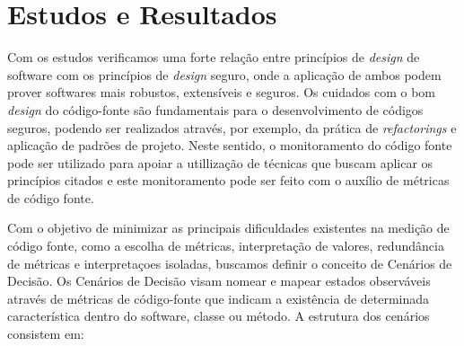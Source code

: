 \section{Estudos e Resultados}
\label{sec:studies}


Com os estudos verificamos uma forte relação entre princípios de \emph{design} de software com os princípios de \emph{design} seguro, onde a aplicação de ambos podem prover softwares mais robustos, extensíveis e seguros. Os cuidados com o bom \emph{design} do código-fonte são fundamentais para o desenvolvimento de códigos seguros, podendo ser realizados através, por exemplo, da prática de \emph{refactorings} e aplicação de padrões de projeto. Neste sentido, o monitoramento do código fonte pode ser utilizado para apoiar a utillização de técnicas que buscam aplicar os princípios citados e este monitoramento pode ser feito com o auxílio de métricas de código fonte.

Com o objetivo de minimizar as principais dificuldades existentes na medição de código fonte, como a escolha de métricas, interpretação de valores, redundância de métricas e interpretaçoes isoladas, buscamos definir o conceito de Cenários de Decisão. Os Cenários de Decisão  visam nomear e mapear estados observáveis através de métricas de código-fonte que indicam a existência de determinada característica dentro do software, classe ou método. A estrutura dos cenários consistem em:

